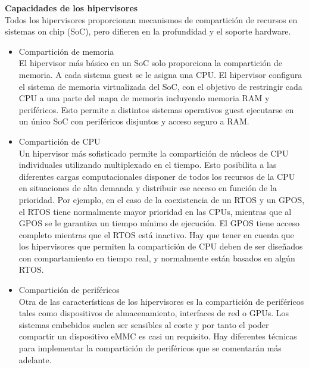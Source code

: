 \textbf{Capacidades de los hipervisores}\\
Todos los hipervisores proporcionan mecanismos de compartición de recursos en sistemas on chip (\acrshort{SoC}), pero difieren en la profundidad y el soporte hardware.
\begin{itemize}
	\item Compartición de memoria\\
	El hipervisor más básico en un \acrshort{SoC} solo proporciona la compartición de memoria. A cada sistema guest se le asigna una CPU. El hipervisor configura el sistema de memoria virtualizada del \acrshort{SoC}, con el objetivo de restringir cada CPU a una parte del mapa de memoria incluyendo memoria RAM y periféricos. Esto permite a distintos sistemas operativos guest ejecutarse en un único \acrshort{SoC} con periféricos disjuntos y acceso seguro a \acrshort{RAM}.
	\item Compartición de CPU\\
	Un hipervisor más sofisticado permite la compartición de núcleos de CPU individuales utilizando multiplexado en el tiempo. Esto posibilita a las diferentes cargas computacionales disponer de todos los recursos de la CPU en situaciones de alta demanda y distribuir ese acceso en función de la prioridad. Por ejemplo, en el caso de la coexistencia de un \acrshort{RTOS} y un \acrshort{GPOS}, el \acrshort{RTOS} tiene normalmente mayor prioridad en las CPUs, mientras que al \acrshort{GPOS} se le garantiza un tiempo mínimo de ejecución. El \acrshort{GPOS} tiene acceso completo mientras que el \acrshort{RTOS} está inactivo. Hay que tener en cuenta que los hipervisores que permiten la compartición de CPU deben de ser diseñados con compartamiento en tiempo real, y normalmente están basados en algún \acrshort{RTOS}.
	\item Compartición de periféricos\\
	Otra de las características de los hipervisores es la compartición de periféricos tales como dispositivos de almacenamiento, interfaces de red o \acrshort{GPU}s. Los sistemas embebidos suelen ser sensibles al coste y por tanto el poder compartir un dispositivo \acrshort{eMMC} es casi un requisito. Hay diferentes técnicas para implementar la compartición de periféricos que se comentarán más adelante.
\end{itemize}


